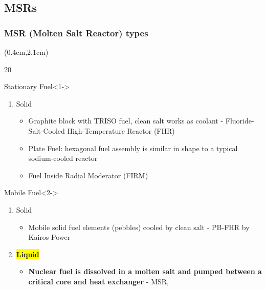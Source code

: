 \subsection{\glspl{MSR}}

\begin{frame}
\frametitle{MSR (Molten Salt Reactor) types}
\begin{textblock*}{12cm}(0.4cm,2.1cm) %
	\begin{overlayarea}{\linewidth}{20\baselineskip}
		\begin{block}{Stationary Fuel}<1->
			\begin{enumerate}
				\item Solid
				\begin{itemize}
					\item Graphite block with TRISO fuel, clean salt works as 
					coolant - Fluoride-Salt-Cooled High-Temperature Reactor 
					(FHR)
					\item Plate Fuel: hexagonal fuel assembly is similar in 
					shape 
					to a typical sodium-cooled reactor
					\item Fuel Inside Radial Moderator (FIRM)
				\end{itemize}
			\end{enumerate}
		\end{block}
		
		\begin{block}{Mobile Fuel}<2->
			\begin{enumerate}
				\item Solid
				\begin{itemize}
					\item<2-> Mobile solid fuel elements (pebbles) cooled by 
					clean salt - PB-FHR by Kairos Power
				\end{itemize}
				\item<3-> \colorbox{yellow}{\textbf{Liquid}}
				\begin{itemize}
					\item \textbf{Nuclear fuel is dissolved in a molten 
					salt and pumped between a critical core and heat 
					exchanger} -  MSR, 
				\end{itemize}
			\end{enumerate}
		\end{block}
	\end{overlayarea}
\end{textblock*}
\end{frame}

